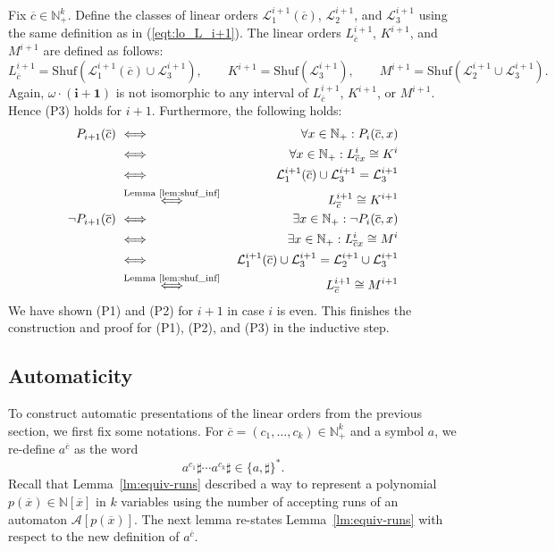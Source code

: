 \documentclass[envcountsame]{llncs}
\newcommand{\A}{\mathcal A}
\renewcommand{\L}{\mathcal L}
\newcommand{\N}{\mathbb N}
\renewcommand{\L}{\mathcal L}
\newcommand{\Shuf}{\mathrm{Shuf}}
\begin{document}
Fix $\overline{c}\in \N^{k}_+$. Define the classes of 
linear orders $\L^{i+1}_1(\overline{c})$, $\L^{i+1}_2$, and $\L^{i+1}_3$ using the same definition as in (\ref{eqt:lo_L_i+1}). 
The linear orders $L^{i+1}_{\overline{c}}$, $K^{i+1}$, and $M^{i+1}$ are defined as follows:
\[
    L^{i+1}_{\overline{c}} = \Shuf(\L^{i+1}_1(\overline{c}) \cup \L_3^{i+1}), 
\qquad K^{i+1} = \Shuf( \L_3^{i+1}), \qquad M^{i+1} = \Shuf(\L_2^{i+1}\cup
\L_3^{i+1}) .
\]
Again, $\omega\cdot \mathbf{(i+1)}$ is not isomorphic to any interval of $L^{i+1}_{\overline{c}}$, $K^{i+1}$, or $M^{i+1}$. 
Hence (P3) holds for $i+1$. Furthermore, the following holds:
\begin{eqnarray*}
P_{i+1}(\overline{c}) \ & \Longleftrightarrow & \ \forall x \in \N_+ : P_i(\overline{c},x) \\
 & \Longleftrightarrow & \ \forall x \in \N_+ : L^i_{\overline{c}x} \cong K^i \\
 & \Longleftrightarrow & \  \L^{i+1}_1(\overline{c})\cup \L^{i+1}_3 = \L^{i+1}_3 \\
 & \stackrel{\text{Lemma~\ref{lem:shuf_inf}}}{\Longleftrightarrow} & \ L^{i+1}_{\overline{c}}\cong K^{i+1} \\
\neg P_{i+1}(\overline{c}) \ & \Longleftrightarrow & \ \exists x \in \N_+ : \neg P_i(\overline{c},x) \\
 & \Longleftrightarrow & \ \exists x \in \N_+ : L^i_{\overline{c}x} \cong M^i \\
 & \Longleftrightarrow & \  \L^{i+1}_1(\overline{c})\cup \L^{i+1}_3 = \L^{i+1}_2\cup \L^{i+1}_3 \\
 & \stackrel{\text{Lemma~\ref{lem:shuf_inf}}}{\Longleftrightarrow} & \ L^{i+1}_{\overline{c}}\cong M^{i+1}
\end{eqnarray*}
We have shown (P1) and (P2) for $i+1$ in case $i$ is even.
This finishes the construction and proof for (P1), (P2), and (P3) in the inductive step.



\subsection{Automaticity}

To construct automatic presentations of the linear orders from the
previous section, we first fix some notations.
For $\overline{c} = (c_1,\ldots,c_k) \in \N_+^k$ and a symbol $a$, we re-define $a^{\overline{c}}$ as the word
\[
    a^{c_1}\sharp \cdots a^{c_k} \sharp \in \{a,\sharp\}^*.
\]
Recall that Lemma~\ref{lm:equiv-runs} described a way to represent a polynomial 
$p(\overline{x})\in \N[\overline{x}]$ in $k$ variables using the number of accepting runs of an 
automaton $\A[p(\overline{x})]$. The next lemma re-states Lemma~\ref{lm:equiv-runs} 
with respect to the new definition of $a^{\overline{c}}$.
\end{document}
